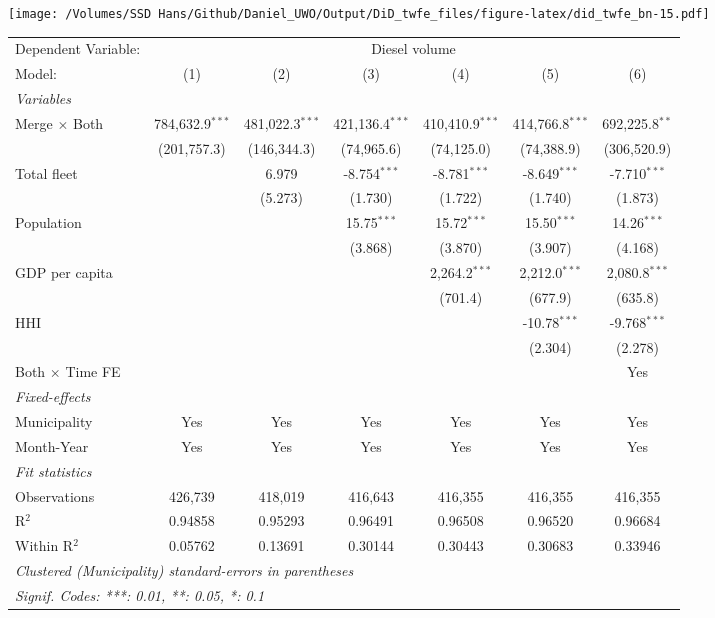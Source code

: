 \documentclass[
]{article}
\begin{document}
\texttt{[image: /Volumes/SSD Hans/Github/Daniel\_UWO/Output/DiD\_twfe\_files/figure-latex/did\_twfe\_bn-15.pdf]}

\begin{tabular}{lcccccc}
\tabularnewline\midrule\midrule
Dependent Variable:&\multicolumn{6}{c}{Diesel volume}\\
Model:&(1) & (2) & (3) & (4) & (5) & (6)\\
\midrule \emph{Variables}&   &   &   &   &   &  \\
Merge $\times $ Both & 784,632.9$^{***}$ & 481,022.3$^{***}$ & 421,136.4$^{***}$ & 410,410.9$^{***}$ & 414,766.8$^{***}$ & 692,225.8$^{**}$\\
  &(201,757.3) & (146,344.3) & (74,965.6) & (74,125.0) & (74,388.9) & (306,520.9)\\
Total fleet &    & 6.979 & -8.754$^{***}$ & -8.781$^{***}$ & -8.649$^{***}$ & -7.710$^{***}$\\
  &   & (5.273) & (1.730) & (1.722) & (1.740) & (1.873)\\
Population &    &    & 15.75$^{***}$ & 15.72$^{***}$ & 15.50$^{***}$ & 14.26$^{***}$\\
  &   &    & (3.868) & (3.870) & (3.907) & (4.168)\\
GDP per capita &    &    &    & 2,264.2$^{***}$ & 2,212.0$^{***}$ & 2,080.8$^{***}$\\
  &   &    &    & (701.4) & (677.9) & (635.8)\\
HHI &    &    &    &    & -10.78$^{***}$ & -9.768$^{***}$\\
  &   &    &    &    & (2.304) & (2.278)\\
Both $\times$ Time FE &  &  &  &  &  & Yes\\
\midrule \emph{Fixed-effects}&   &   &   &   &   &  \\
Municipality & Yes & Yes & Yes & Yes & Yes & Yes\\
Month-Year & Yes & Yes & Yes & Yes & Yes & Yes\\
\midrule \emph{Fit statistics}&  & & & & & \\
Observations & 426,739&418,019&416,643&416,355&416,355&416,355\\
R$^2$ & 0.94858&0.95293&0.96491&0.96508&0.96520&0.96684\\
Within R$^2$ & 0.05762&0.13691&0.30144&0.30443&0.30683&0.33946\\
\midrule\midrule\multicolumn{7}{l}{\emph{Clustered (Municipality) standard-errors in parentheses}}\\
\multicolumn{7}{l}{\emph{Signif. Codes: ***: 0.01, **: 0.05, *: 0.1}}\\
\end{tabular}
\end{document}
